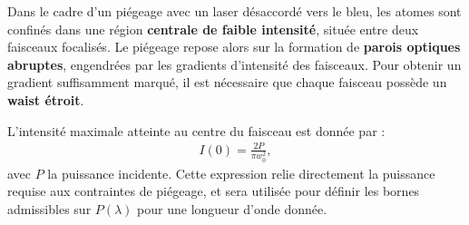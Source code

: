 \medskip

Dans le cadre d’un piégeage avec un laser désaccordé vers le
bleu, les atomes sont confinés dans une région \textbf{centrale de faible intensité}, située entre deux faisceaux focalisés. Le piégeage repose alors sur la formation de \textbf{parois optiques abruptes}, engendrées par les gradients d’intensité des faisceaux. Pour obtenir un gradient suffisamment marqué, il est nécessaire que chaque faisceau possède un \textbf{waist étroit}.


%

L’intensité maximale atteinte au centre du faisceau est donnée par :
\begin{eqnarray}
	I(0) = \frac{2P}{\pi w_0^2},
\end{eqnarray}
avec $P$ la puissance incidente. Cette expression relie directement la puissance requise aux contraintes de piégeage, et sera utilisée pour définir les bornes admissibles sur $P(\lambda)$ pour une longueur d’onde donnée.


